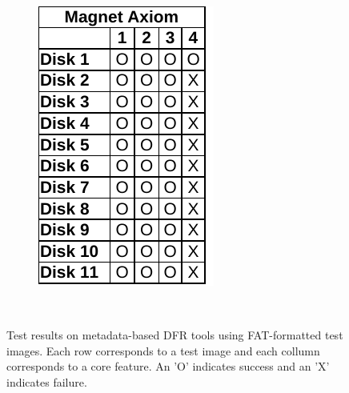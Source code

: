 \begin{paraphrase}
\begin{figure}
\begin{subfigure}[t]{0.17\linewidth}
        \includegraphics[width=\linewidth]{fig/axiom_results_fat.pdf}
    \end{subfigure}~~
        
    \caption{Test results on metadata-based DFR tools using FAT-formatted test images. Each row corresponds to a test image and each collumn corresponds to a core feature. An 'O' indicates success and an 'X' indicates failure.}
    \label{fig:results_fat}
\end{figure}

\begin{figure}
    \centering


\end{figure}
\end{paraphrase}
